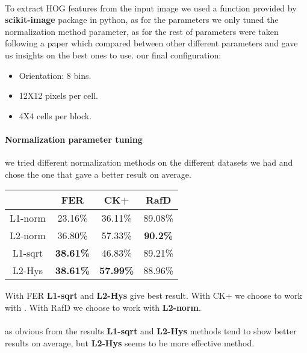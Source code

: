 \paragraph{}
To extract HOG features from the input image we used a function provided by \textbf{scikit-image} package in python, as for the parameters we only tuned the normalization method parameter, as for the rest of parameters were taken following a paper\cite{hog} which compared between other different parameters and gave us insights on the best ones to use.\newline 
our final configuration: \newline
\begin{itemize}
\item Orientation: 8 bins. 
\item 12X12 pixels per cell. 
\item 4X4 cells per block.
\end{itemize}

\paragraph{Normalization parameter tuning}
we tried different normalization methods on the different datasets we had and chose the one that gave a better result on average.

\begin{center}
\begin{tabular}{ c|c|c|c }
	  & FER & CK+ & RafD \\ \hline
	 L1-norm & 23.16\% & 36.11\% & 89.08\% \\  
	 L2-norm & 36.80\% & 57.33\% & \textbf{90.2\%} \\
	 L1-sqrt & \textbf{38.61\%} & 46.83\% & 89.21\% \\
	 L2-Hys & \textbf{38.61\%} & \textbf{57.99\%} & 88.96\% \\
\end{tabular}
\end{center}
With FER \textbf{L1-sqrt} and \textbf{L2-Hys} give best result.\newline
With CK+ we choose to work with  .\newline
With RafD we choose to work with  \textbf{L2-norm}. \newline
\paragraph{}
as obvious from the results \textbf{L1-sqrt} and \textbf{L2-Hys} methods tend to show better results on average, but \textbf{L2-Hys} seems to be more effective method.
